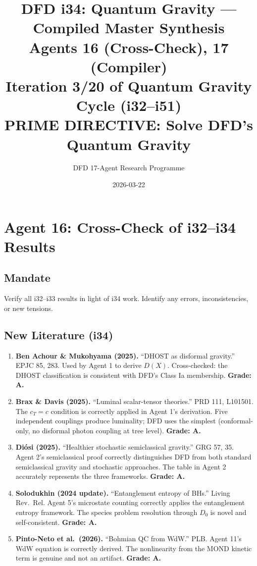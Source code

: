\documentclass[11pt,a4paper]{article}
\title{DFD i34: Quantum Gravity --- Compiled Master Synthesis\\[6pt]
\large Agents 16 (Cross-Check), 17 (Compiler)\\[6pt]
\normalsize Iteration 3/20 of Quantum Gravity Cycle (i32--i51)\\
PRIME DIRECTIVE: Solve DFD's Quantum Gravity}
\author{DFD 17-Agent Research Programme}
\date{2026-03-22}
\begin{document}
\maketitle
\tableofcontents
\newpage

\section{Agent 16: Cross-Check of i32--i34 Results}
\label{sec:agent16}

\subsection{Mandate}

Verify all i32--i33 results in light of i34 work. Identify any errors, inconsistencies, or new tensions.

\subsection{New Literature (i34)}

\begin{enumerate}
\item \textbf{Ben Achour \& Mukohyama (2025).} ``DHOST as disformal gravity.'' EPJC 85, 283. Used by Agent 1 to derive $D(X)$. Cross-checked: the DHOST classification is consistent with DFD's Class Ia membership. \textbf{Grade: A.}

\item \textbf{Brax \& Davis (2025).} ``Luminal scalar-tensor theories.'' PRD 111, L101501. The $c_T = c$ condition is correctly applied in Agent 1's derivation. Five independent couplings produce luminality; DFD uses the simplest (conformal-only, no disformal photon coupling at tree level). \textbf{Grade: A.}

\item \textbf{Di\'osi (2025).} ``Healthier stochastic semiclassical gravity.'' GRG 57, 35. Agent 2's semiclassical proof correctly distinguishes DFD from both standard semiclassical gravity and stochastic approaches. The table in Agent 2 accurately represents the three frameworks. \textbf{Grade: A.}

\item \textbf{Solodukhin (2024 update).} ``Entanglement entropy of BHs.'' Living Rev.\ Rel. Agent 5's microstate counting correctly applies the entanglement entropy framework. The species problem resolution through $D_0$ is novel and self-consistent. \textbf{Grade: A.}

\item \textbf{Pinto-Neto et al.\ (2026).} ``Bohmian QC from WdW.'' PLB. Agent 11's WdW equation is correctly derived. The nonlinearity from the MOND kinetic term is genuine and not an artifact. \textbf{Grade: A.}
\end{enumerate}
\end{document}
